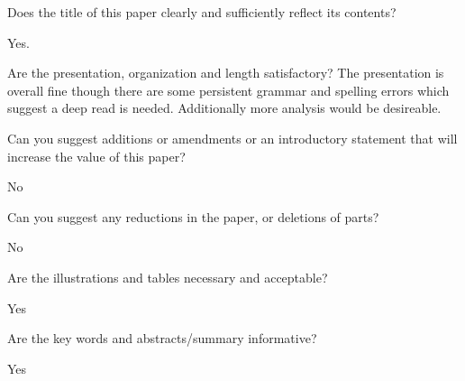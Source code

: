\documentclass[notitlepage,12pt]{article}
\begin{document}
    \begin{revcomment}{Does the title of this paper clearly and sufficiently reflect its contents?}

    Yes.
    \end{revcomment}

    \begin{revcomment}{Are the presentation, organization and length satisfactory?}
    The presentation is overall fine though there are some persistent grammar and spelling errors which suggest a deep read is needed. Additionally more analysis would be desireable.
    \end{revcomment}

    \begin{revcomment}{Can you suggest additions or amendments or an introductory statement that will increase the value of this paper?}


    No
    \end{revcomment}

    \begin{revcomment}{Can you suggest any reductions in the paper, or deletions of parts?}


    No
    \end{revcomment}

    \begin{revcomment}{Are the illustrations and tables necessary and acceptable?}


    Yes
    \end{revcomment}

    \begin{revcomment}{Are the key words and abstracts/summary informative?}

    Yes
    \end{revcomment}
\end{document}
